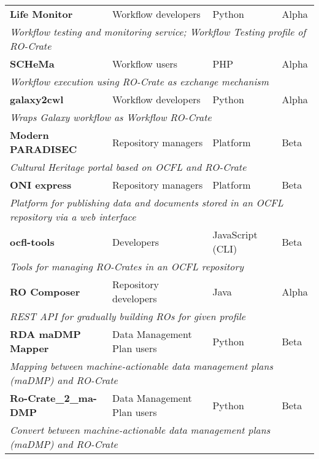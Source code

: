 \begin{table}[htbp]
\begin{tabular}{llll}
		\textbf{Life Monitor} \citep{about-lifemonitor} & Workflow developers & Python & Alpha \\
		\multicolumn{4}{l}{\it Workflow testing and monitoring service; Workflow Testing profile of RO-Crate} \\
		
        \textbf{SCHeMa} \citep{vergoulis2021schema} & Workflow users & PHP & Alpha \\
        \multicolumn{4}{l}{\it Workflow execution using RO-Crate as exchange mechanism} \\

		\textbf{galaxy2cwl} \citep{galaxy2cwl} & Workflow developers & Python & Alpha \\
		\multicolumn{4}{l}{\it Wraps Galaxy workflow as Workflow RO-Crate} \\

		\textbf{Modern PARADISEC} \citep{modpdsc} & Repository managers & Platform & Beta \\
		\multicolumn{4}{l}{\it Cultural Heritage portal based on OCFL and RO-Crate} \\
		
		\textbf{ONI express} \citep{arkisto-data-portal} & Repository managers & Platform & Beta \\
		\multicolumn{4}{l}{\it Platform for publishing data and documents stored in an OCFL repository via a web interface} \\
		
		\textbf{ocfl-tools} \citep{ocfl-tools} & Developers & JavaScript (CLI) & Beta \\
		\multicolumn{4}{l}{\it Tools for managing RO-Crates in an OCFL repository}\\
		
		\textbf{RO Composer} \citep{ro-composer} & Repository developers & Java & Alpha \\ 
		\multicolumn{4}{l}{\it REST API for gradually building ROs for given profile} \\
		
		\textbf{RDA maDMP Mapper} \citep{doi:10.5281/zenodo.3922136} & Data Management Plan users & Python & Beta \\
		\multicolumn{4}{l}{\it Mapping between machine-actionable data management plans (maDMP) and RO-Crate \citep{doi:10.4126/frl01-006423291} } \\

        \textbf{Ro-Crate\_2\_ma-DMP} \citep{doi:10.5281/zenodo.3903463} & Data Management Plan users & Python & Beta \\
        \multicolumn{4}{l}{\it Convert between machine-actionable data management plans (maDMP) and RO-Crate } \\
        

\end{tabular}
\end{table}
